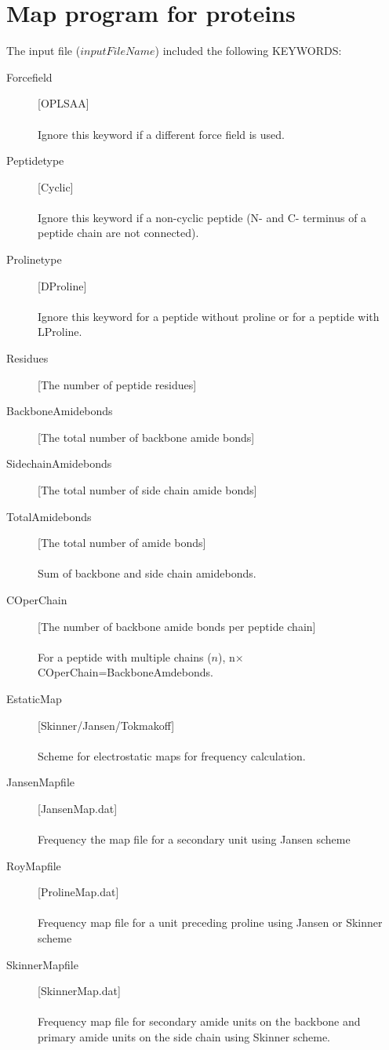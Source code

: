 \documentclass[12pt]{book}
\begin{document}
\section{Map program for proteins}
The input file ($inputFileName$) included the following KEYWORDS:
\begin{description}
\item [Forcefield] [OPLSAA]  \\\\  Ignore this keyword if a different force field is used.
\item [Peptidetype] [Cyclic]   \\\\ Ignore this keyword if a non-cyclic peptide (N- and C- terminus of a peptide chain are not connected).
\item [Prolinetype] [DProline]  \\\\ Ignore this keyword for a peptide without proline or for a peptide with LProline. 
\item [Residues] [The number of peptide residues]
\item [BackboneAmidebonds] [The total number of backbone amide bonds]
\item [SidechainAmidebonds] [The total number of side chain amide bonds]
\item [TotalAmidebonds] [The total number of amide bonds]  \\\\ Sum of backbone and side chain amidebonds.
\item [COperChain] [The number of backbone amide bonds per peptide chain]  \\\\ For a peptide with multiple chains ($n$), n$\times$COperChain=BackboneAmdebonds.
\item [EstaticMap] [Skinner/Jansen/Tokmakoff]  \\\\ Scheme for electrostatic maps for frequency calculation.
\item [JansenMapfile] [JansenMap.dat] \\\\ Frequency the map file for a secondary unit using Jansen scheme
\item [RoyMapfile][ProlineMap.dat] \\\\ Frequency map file for a unit preceding proline using Jansen or Skinner scheme
\item [SkinnerMapfile] [SkinnerMap.dat] \\\\ Frequency map file for secondary amide units on the backbone and primary amide units on the side chain using Skinner scheme.

\end{description}
\end{document}

